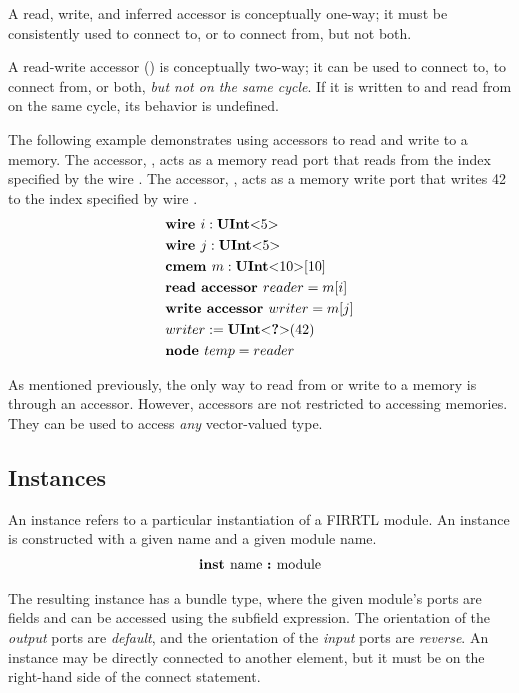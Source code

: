 \documentclass[12pt]{article}
\begin{document}
A read, write, and inferred accessor is conceptually one-way; it must be consistently used to connect to, or to connect from, but not both.

A read-write accessor () is conceptually two-way; it can be used to connect to, to connect from, or both, {\em but not on the same cycle}.
If it is written to and read from on the same cycle, its behavior is undefined.

The following example demonstrates using accessors to read and write to a memory.
The accessor, , acts as a memory read port that reads from the index specified by the wire .
The accessor, , acts as a memory write port that writes 42 to the index specified by wire .
\[
\begin{aligned}
&\text{\bf wire\ } i : \text{\bf UInt}\text{\bf $<$} 5 \text{\bf $>$} \\
&\text{\bf wire\ } j : \text{\bf UInt}\text{\bf $<$} 5 \text{\bf $>$} \\
&\text{\bf cmem\ } m : \text{\bf UInt}\text{\bf $<$} 10 \text{\bf $>$}[10] \\
&\text{\bf read\ } \text{\bf accessor\ } reader = m[i] \\
&\text{\bf write\ } \text{\bf accessor\ } writer = m[j] \\
&writer := \text{\bf UInt}\text{\bf $<$} \text{\bf ?} \text{\bf $>$}(42) \\
&\text{\bf node\ } temp = reader \\
\end{aligned}
\]

As mentioned previously, the only way to read from or write to a memory is through an accessor.
However, accessors are not restricted to accessing memories.
They can be used to access {\em any} vector-valued type. 

\subsection{Instances}
An instance refers to a particular instantiation of a FIRRTL module.
An instance is constructed with a given name and a given module name.
\[
\begin{aligned}
\text{\bf inst\ } \text{name } \text{\bf :\ } \text{module}
\end{aligned}
\]

The resulting instance has a bundle type, where the given module's ports are fields and can be accessed using the subfield expression.
The orientation of the {\em output} ports are {\em default}, and the orientation of the {\em input} ports are {\em reverse}.
An instance may be directly connected to another element, but it must be on the right-hand side of the connect statement.
\end{document}
